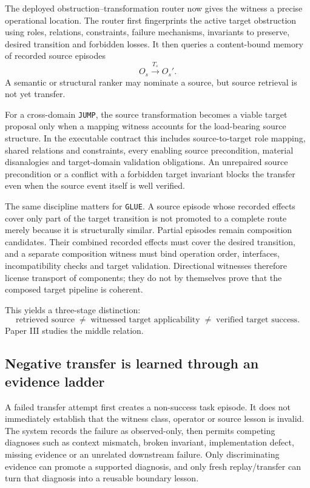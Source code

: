 The deployed obstruction--transformation router now gives the witness a precise operational location. The router first fingerprints the active target obstruction using roles, relations, constraints, failure mechanisms, invariants to preserve, desired transition and forbidden losses. It then queries a content-bound memory of recorded source episodes
\[
O_s\xrightarrow{T_s}O_s'.
\]
A semantic or structural ranker may nominate a source, but source retrieval is not yet transfer.

For a cross-domain \texttt{JUMP}, the source transformation becomes a viable target proposal only when a mapping witness accounts for the load-bearing source structure. In the executable contract this includes source-to-target role mapping, shared relations and constraints, every enabling source precondition, material disanalogies and target-domain validation obligations. An unrepaired source precondition or a conflict with a forbidden target invariant blocks the transfer even when the source event itself is well verified.

The same discipline matters for \texttt{GLUE}. A source episode whose recorded effects cover only part of the target transition is not promoted to a complete route merely because it is structurally similar. Partial episodes remain composition candidates. Their combined recorded effects must cover the desired transition, and a separate composition witness must bind operation order, interfaces, incompatibility checks and target validation. Directional witnesses therefore license transport of components; they do not by themselves prove that the composed target pipeline is coherent.

This yields a three-stage distinction:
\[
\text{retrieved source}
\;\neq\;
\text{witnessed target applicability}
\;\neq\;
\text{verified target success}.
\]
Paper III studies the middle relation.

\subsection{Negative transfer is learned through an evidence ladder}
A failed transfer attempt first creates a non-success task episode. It does not immediately establish that the witness class, operator or source lesson is invalid. The system records the failure as observed-only, then permits competing diagnoses such as context mismatch, broken invariant, implementation defect, missing evidence or an unrelated downstream failure. Only discriminating evidence can promote a supported diagnosis, and only fresh replay/transfer can turn that diagnosis into a reusable boundary lesson.

